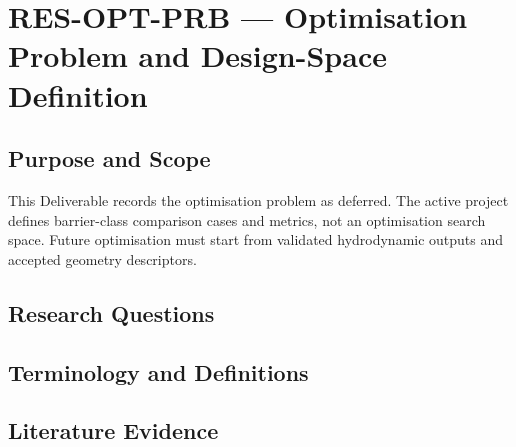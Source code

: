 
\section{RES-OPT-PRB --- Optimisation Problem and Design-Space Definition}
\label{sec:res-opt-prb}

\subsection{Purpose and Scope}
\label{sec:res-opt-prb-purpose}

This Deliverable records the optimisation problem as deferred. The
active project defines barrier-class comparison cases and metrics, not
an optimisation search space. Future optimisation must start from
validated hydrodynamic outputs and accepted geometry descriptors.

\subsection{Research Questions}
\label{sec:res-opt-prb-research-questions}


\subsection{Terminology and Definitions}
\label{sec:res-opt-prb-definitions}


\subsection{Literature Evidence}
\label{sec:res-opt-prb-literature-evidence}

%

